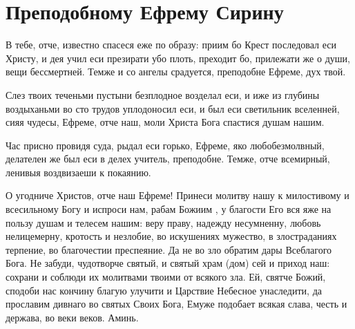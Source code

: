 \begin{mymulticols}
\end{mymulticols}

\section{Преподобному Ефрему Сирину}\begin{mymulticols}


В тебе, отче, известно спасеся еже по образу: приим бо Крест последовал еси Христу, и дея учил еси презирати убо плоть, преходит бо, прилежати же о души, вещи бессмертней. Темже и со ангелы срадуется, преподобне Ефреме, дух твой.


Слез твоих теченьми пустыни безплодное возделал еси, и иже из глубины воздыханьми во сто трудов уплодоносил еси, и был еси светильник вселенней, сияя чудесы, Ефреме, отче наш, моли Христа Бога спастися душам нашим.


Час присно провидя суда, рыдал еси горько, Ефреме, яко любобезмолвный, делателен же был еси в делех учитель, преподобне. Темже, отче всемирный, ленивыя воздвизаеши к покаянию.


О угодниче Христов, отче наш Ефреме! Принеси молитву нашу к милостивому и всесильному Богу и испроси нам, рабам Божиим , у благости Его вся яже на пользу душам и телесем нашим: веру праву, надежду несумненну, любовь нелицемерну, кротость и незлобие, во искушениях мужество, в злостраданиях терпение, во благочестии преспеяние. Да не во зло обратим дары Всеблагого Бога. Не забуди, чудотворче святый, и святый храм (дом) сей и приход наш: сохрани и соблюди их молитвами твоими от всякого зла. Ей, святче Божий, сподоби нас кончину благую улучити и Царствие Небесное унаследити, да прославим дивнаго во святых Своих Бога, Емуже подобает всякая слава, честь и держава, во веки веков. Аминь.

\end{mymulticols}

